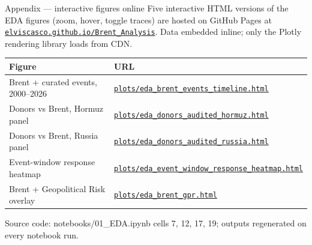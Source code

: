 \documentclass[aspectratio=169,11pt]{beamer}
\newcommand{\smalltext}[1]{{\footnotesize\textcolor{muted}{#1}}}
\newcommand{\hd}[1]{\textbf{#1}}
\begin{document}
\begin{frame}{Appendix --- interactive figures online}
  \footnotesize
  Five interactive HTML versions of the EDA figures (zoom, hover, toggle traces) are hosted on GitHub Pages at \href{https://elviscasco.github.io/Brent_Analysis/}{\texttt{elviscasco.github.io/Brent\_Analysis}}. Data embedded inline; only the Plotly rendering library loads from CDN.

  \vspace{0.6em}
  \begin{tabular}{@{}p{} p{}@{}}
    \toprule
    \hd{Figure} & \hd{URL} \\
    \midrule
    Brent + curated events, 2000--2026 &
      \href{https://elviscasco.github.io/Brent_Analysis/plots/eda_brent_events_timeline.html}{\texttt{plots/eda\_brent\_events\_timeline.html}} \\[0.4em]
    Donors vs Brent, Hormuz panel &
      \href{https://elviscasco.github.io/Brent_Analysis/plots/eda_donors_audited_hormuz.html}{\texttt{plots/eda\_donors\_audited\_hormuz.html}} \\[0.4em]
    Donors vs Brent, Russia panel &
      \href{https://elviscasco.github.io/Brent_Analysis/plots/eda_donors_audited_russia.html}{\texttt{plots/eda\_donors\_audited\_russia.html}} \\[0.4em]
    Event-window response heatmap &
      \href{https://elviscasco.github.io/Brent_Analysis/plots/eda_event_window_response_heatmap.html}{\texttt{plots/eda\_event\_window\_response\_heatmap.html}} \\[0.4em]
    Brent + Geopolitical Risk overlay &
      \href{https://elviscasco.github.io/Brent_Analysis/plots/eda_brent_gpr.html}{\texttt{plots/eda\_brent\_gpr.html}} \\
    \bottomrule
  \end{tabular}

  \vspace{0.6em}
  \smalltext{Source code: notebooks/01\_EDA.ipynb cells 7, 12, 17, 19; outputs regenerated on every notebook run.}
\end{frame}
\end{document}

